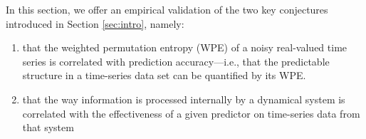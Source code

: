 


In this section, we offer an empirical validation of the two key
conjectures introduced in Section \ref{sec:intro}, namely:

\begin{enumerate}

\item that the weighted permutation entropy (WPE) of a noisy
  real-valued time series is correlated with prediction
  accuracy---i.e., that the predictable structure in a time-series
  data set can be quantified by its WPE.



\item that the way information is processed internally by a dynamical
  system is correlated with the effectiveness of a given predictor on
  time-series data from that system



\end{enumerate}

